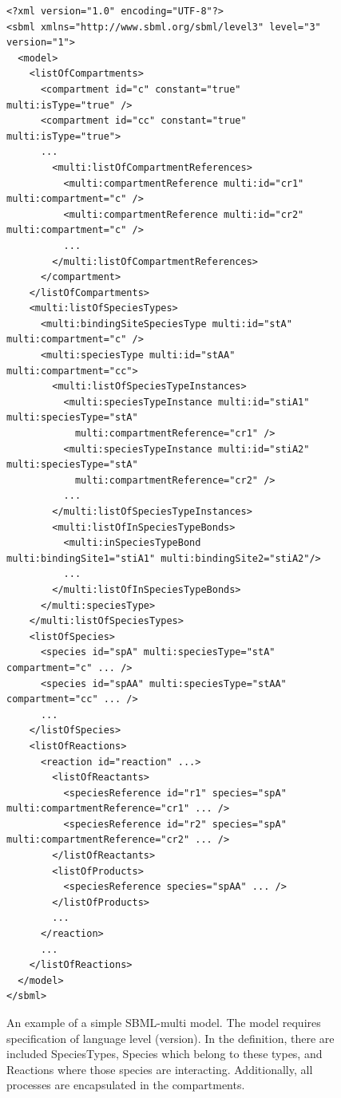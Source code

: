 \documentclass[11pt,a4paper]{report}
\begin{document}
\begin{figure}
\lstset{language=XML}
\begin{lstlisting}[basicstyle=\scriptsize, frame=single]
<?xml version="1.0" encoding="UTF-8"?>
<sbml xmlns="http://www.sbml.org/sbml/level3" level="3" version="1">
  <model>
    <listOfCompartments>
      <compartment id="c" constant="true" multi:isType="true" />
      <compartment id="cc" constant="true" multi:isType="true">
      ...
        <multi:listOfCompartmentReferences>
          <multi:compartmentReference multi:id="cr1" multi:compartment="c" />
          <multi:compartmentReference multi:id="cr2" multi:compartment="c" />
          ...
        </multi:listOfCompartmentReferences>
      </compartment>
    </listOfCompartments>
    <multi:listOfSpeciesTypes>
      <multi:bindingSiteSpeciesType multi:id="stA" multi:compartment="c" />
      <multi:speciesType multi:id="stAA" multi:compartment="cc">
        <multi:listOfSpeciesTypeInstances>
          <multi:speciesTypeInstance multi:id="stiA1" multi:speciesType="stA"
            multi:compartmentReference="cr1" />
          <multi:speciesTypeInstance multi:id="stiA2" multi:speciesType="stA"
            multi:compartmentReference="cr2" />
          ...
        </multi:listOfSpeciesTypeInstances>
        <multi:listOfInSpeciesTypeBonds>
          <multi:inSpeciesTypeBond multi:bindingSite1="stiA1" multi:bindingSite2="stiA2"/>
          ...
        </multi:listOfInSpeciesTypeBonds>
      </multi:speciesType>
    </multi:listOfSpeciesTypes>
    <listOfSpecies>
      <species id="spA" multi:speciesType="stA" compartment="c" ... />
      <species id="spAA" multi:speciesType="stAA" compartment="cc" ... />
      ...
    </listOfSpecies>
    <listOfReactions>
      <reaction id="reaction" ...>
        <listOfReactants>
          <speciesReference id="r1" species="spA" multi:compartmentReference="cr1" ... />
          <speciesReference id="r2" species="spA" multi:compartmentReference="cr2" ... />
        </listOfReactants>
        <listOfProducts>
          <speciesReference species="spAA" ... />
        </listOfProducts>
        ...
      </reaction>
      ...
    </listOfReactions>
  </model>
</sbml>
\end{lstlisting}
\caption{An example of a simple SBML-multi model. The model requires specification of language level (version). In the definition, there are included SpeciesTypes, Species which belong to these types, and Reactions where those species are interacting. Additionally, all processes are encapsulated in the compartments.}\label{SBML_example}
\end{figure}
\end{document}
